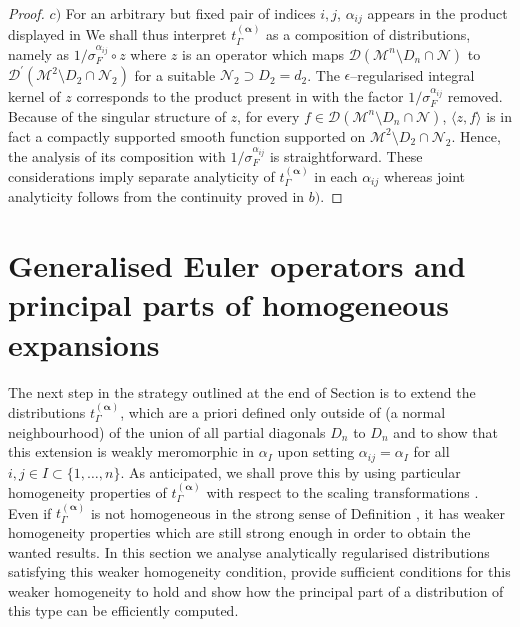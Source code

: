 \documentclass[10pt]{book}
\newcommand{\Dcal}{\mathcal{D}}
\newcommand{\Mcal}{\mathcal{M}}
\newcommand{\Ncal}{\mathcal{N}}
\theoremstyle{break}
\newtheorem{proof}{Proof}
\begin{document}
\begin{proof}
$c)$ 
For an arbitrary but fixed pair of indices $i,j$, $\alpha_{ij}$ appears in the product displayed in %
We shall thus interpret $t_\Gamma^{(\boldsymbol{\alpha})}$ as a composition of distributions, namely as $1/\sigma_F^{\alpha_{ij}}\circ z $
where $z$ is an operator which maps $\Dcal(\Mcal^{n}\setminus D_{n}\cap \Ncal)$ to $ \Dcal^\prime(\Mcal^{2}\setminus D_2\cap \Ncal_2)$ for a suitable $\Ncal_2\supset D_2=d_2$. The $\epsilon$--regularised integral kernel of $z$ corresponds to the product present in %
with the factor  $1/\sigma_F^{\alpha_{ij}}$ removed. Because of the singular structure of $z$, for every $f\in \Dcal(\Mcal^{n}\setminus D_{n}\cap \Ncal)$, $\langle z,f\rangle$ is in fact a compactly supported smooth function supported on $\Mcal^{2}\setminus D_2\cap \Ncal_2$. Hence, the analysis of its composition with $1/\sigma_F^{\alpha_{ij}}$ is straightforward. These considerations imply separate analyticity of $t_\Gamma^{(\boldsymbol{\alpha})}$ in each $\alpha_{ij}$ whereas joint analyticity follows from the continuity proved in $b)$.
\end{proof}



\section{Generalised Euler operators and principal parts of homogeneous expansions}


The next step in the strategy outlined at the end of Section %
is to extend the distributions $t^{(\boldsymbol{\alpha})}_\Gamma$, which are a priori defined only outside of (a normal neighbourhood) of the union of all partial diagonals $D_n$ to $D_n$ and to show that this extension is weakly meromorphic in $\alpha_I$ upon setting $\alpha_{ij}=\alpha_I$ for all $i,j\in I\subset \{1,\ldots,n\}$. As anticipated, we shall prove this by using particular homogeneity properties of $t^{(\boldsymbol{\alpha})}_\Gamma$ with respect to the scaling transformations %
. Even if $t^{(\boldsymbol{\alpha})}_\Gamma$ is not homogeneous in the strong sense of Definition %
, it has weaker homogeneity properties which are still strong enough in order to obtain the wanted results. In this section we analyse analytically regularised distributions satisfying this weaker homogeneity condition, provide sufficient conditions for this weaker homogeneity to hold and show how the principal part of a 
distribution of this type can be efficiently computed.
\end{document}
